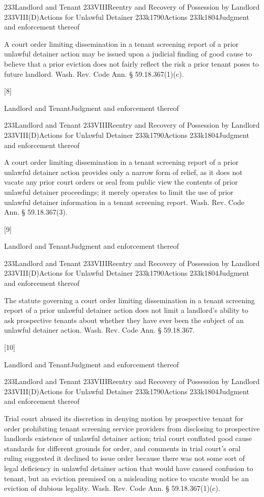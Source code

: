 \documentclass[11pt]{article}
\begin{document}
233Landlord and Tenant
233VIIIReentry and Recovery of Possession by Landlord
233VIII(D)Actions for Unlawful Detainer
233k1790Actions
233k1804Judgment and enforcement thereof


A court order limiting dissemination in a tenant screening report of a prior unlawful detainer action may be issued upon a judicial finding of good cause to believe that a prior eviction does not fairly reflect the risk a prior tenant poses to future landlord. Wash. Rev. Code Ann. § 59.18.367(1)(c).




[8]

Landlord and TenantJudgment and enforcement thereof


233Landlord and Tenant
233VIIIReentry and Recovery of Possession by Landlord
233VIII(D)Actions for Unlawful Detainer
233k1790Actions
233k1804Judgment and enforcement thereof


A court order limiting dissemination in a tenant screening report of a prior unlawful detainer action provides only a narrow form of relief, as it does not vacate any prior court orders or seal from public view the contents of prior unlawful detainer proceedings; it merely operates to limit the use of prior unlawful detainer information in a tenant screening report. Wash. Rev. Code Ann. § 59.18.367(3).




[9]

Landlord and TenantJudgment and enforcement thereof


233Landlord and Tenant
233VIIIReentry and Recovery of Possession by Landlord
233VIII(D)Actions for Unlawful Detainer
233k1790Actions
233k1804Judgment and enforcement thereof


The statute governing a court order limiting dissemination in a tenant screening report of a prior unlawful detainer action does not limit a landlord’s ability to ask prospective tenants about whether they have ever been the subject of an unlawful detainer action. Wash. Rev. Code Ann. § 59.18.367.




[10]

Landlord and TenantJudgment and enforcement thereof


233Landlord and Tenant
233VIIIReentry and Recovery of Possession by Landlord
233VIII(D)Actions for Unlawful Detainer
233k1790Actions
233k1804Judgment and enforcement thereof


Trial court abused its discretion in denying motion by prospective tenant for order prohibiting tenant screening service providers from disclosing to prospective landlords existence of unlawful detainer action; trial court conflated good cause standards for different grounds for order, and comments in trial court’s oral ruling suggested it declined to issue order because there was not some sort of legal deficiency in unlawful detainer action that would have caused confusion to tenant, but an eviction premised on a misleading notice to vacate would be an eviction of dubious legality. Wash. Rev. Code Ann. § 59.18.367(1)(c).
\end{document}
